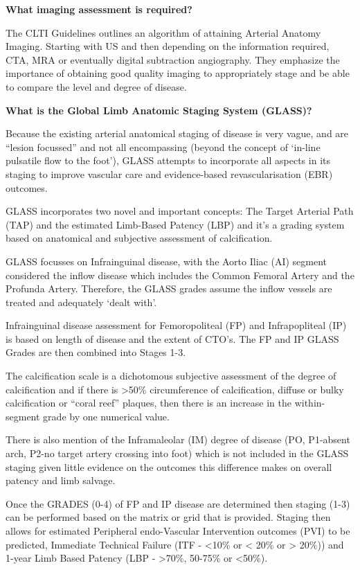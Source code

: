 \documentclass[
]{book}
\begin{document}
\textbf{What imaging assessment is required?}

The CLTI Guidelines outlines an algorithm of attaining Arterial Anatomy
Imaging. Starting with US and then depending on the information
required, CTA, MRA or eventually digital subtraction angiography. They
emphasize the importance of obtaining good quality imaging to
appropriately stage and be able to compare the level and degree of
disease.

\textbf{What is the Global Limb Anatomic Staging System (GLASS)?}
\citep{conteGlobalVascularGuidelines2019a}

Because the existing arterial anatomical staging of disease is very
vague, and are ``lesion focussed'' and not all encompassing (beyond the
concept of `in-line pulsatile flow to the foot'), GLASS attempts to
incorporate all aspects in its staging to improve vascular care and
evidence-based revascularisation (EBR) outcomes.~

GLASS incorporates two novel and important concepts: The Target Arterial
Path (TAP) and the estimated Limb-Based Patency (LBP) and it's a grading
system based on anatomical and subjective assessment of calcification.

GLASS focusses on Infrainguinal disease, with the Aorto Iliac (AI)
segment considered the inflow disease which includes the Common Femoral
Artery and the Profunda Artery. Therefore, the GLASS grades assume the
inflow vessels are treated and adequately `dealt with'.~

Infrainguinal disease assessment for Femoropoliteal (FP) and
Infrapopliteal (IP) is based on length of disease and the extent of
CTO's. The FP and IP GLASS Grades are then combined into Stages 1-3.~

The calcification scale is a dichotomous subjective assessment of the
degree of calcification and if there is \textgreater50\% circumference of
calcification, diffuse or bulky calcification or ``coral reef'' plaques,
then there is an increase in the within-segment grade by one numerical
value.

There is also mention of the Inframaleolar (IM) degree of disease (PO,
P1-absent arch, P2-no target artery crossing into foot) which is not
included in the GLASS staging given little evidence on the outcomes this
difference makes on overall patency and limb salvage.

Once the GRADES (0-4) of FP and IP disease are determined then staging
(1-3) can be performed based on the matrix or grid that is provided.
Staging then allows for estimated Peripheral endo-Vascular Intervention
outcomes (PVI) to be predicted, Immediate Technical Failure (ITF - \textless10\%
or \textless{} 20\% or \textgreater{} 20\%)) and 1-year Limb Based Patency (LBP - \textgreater70\%, 50-75\%
or \textless50\%).~
\end{document}
